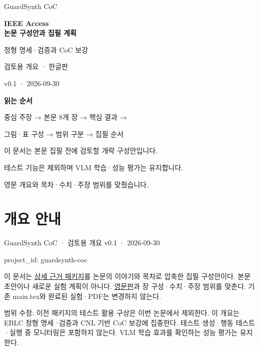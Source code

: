 \documentclass[11pt,a4paper]{article}
\begin{document}
\begin{titlepage}
\vspace*{20mm}
{\color{navy}\Large GuardSynth CoC\par}
\vspace{10mm}
{\huge\bfseries IEEE Access\\[4mm]논문 구성안과 집필 계획\par}
\vspace{12mm}
{\Large 정형 명세·검증과 CoC 보강\par}
\vspace{6mm}
검토용 개요 · 한글판\par
v0.1 · 2026-09-30\par
\vspace{12mm}
\textbf{읽는 순서}\par
중심 주장 → 본문 8개 장 → 핵심 결과 →\par
그림·표 구성 → 범위 구분 → 집필 순서\par
\vfill
이 문서는 본문 집필 전에 검토할 개략 구성안입니다.\par
테스트 기능은 제외하며 VLM 학습·성능 평가는 유지합니다.\par
영문 개요와 목차·수치·주장 범위를 맞췄습니다.\par
\end{titlepage}
\tableofcontents
\clearpage
\section*{개요 안내}


GuardSynth CoC · 검토용 개요 v0.1 · 2026-09-30\par

project\_\allowbreak{}id: {\ttfamily\small guardsynth-coc}\par

이 문서는 \href{\detokenize{../../../../../../projects/04-guardsynth-coc/paper/GUARDSYNTH_COC_METHODS_SETTINGS_PACKAGE_V01_KO.md}}{상세 근거 패키지}를 논문의 이야기와 목차로 압축한 집필 구성안이다. 본문 초안이나 새로운 실험 계획이 아니다. \href{\detokenize{../../../../../../projects/04-guardsynth-coc/paper/ieee-access/IEEE_ACCESS_MANUSCRIPT_OUTLINE_V01_EN.md}}{영문판}과 장 구성·수치·주장 범위를 맞춘다. 기존 main.tex와 완료된 실험·PDF는 변경하지 않는다.\par

범위 수정: 이전 패키지의 테스트 활용 구상은 이번 논문에서 제외한다. 이 개요는 EBLC 정형 명세·검증과 CNL 기반 CoC 보강에 집중한다. 테스트 생성·행동 테스트·실행 중 모니터링은 포함하지 않는다. VLM 학습 효과를 확인하는 성능 평가는 유지한다.\par
\end{document}
